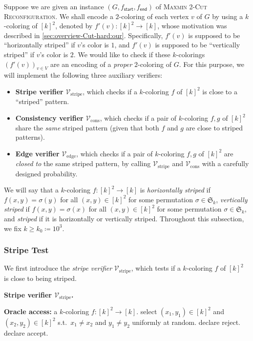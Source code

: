 \documentclass[11pt,fleqn]{article}
\renewcommand{\geq}{\geqslant}
\newcommand{\prb}[1]{\textsc{#1}\xspace}
\newcommand{\defeq}{\coloneq}
\newcommand{\sss}{\mathsf{start}}
\newcommand{\ttt}{\mathsf{end}}
\newcommand{\V}{\calV}
\newcommand{\Accept}{\textsf{accept}\xspace}
\newcommand{\Reject}{\textsf{reject}\xspace}
\newcommand{\f}{f}
\newcommand{\g}{g}
\newcommand{\kzero}{10^3}
\newcommand{\Vstripe}{\V_\mathrm{stripe}}
\newcommand{\Vcons}{\V_\mathrm{cons}}
\newcommand{\Vedge}{\V_\mathrm{edge}}
\newcommand{\MMtwoCutReconf}{\prb{Maxmin 2-Cut Reconfiguration}}
\newcommand{\calV}{\mathcal{V}}
\newcommand{\frakS}{\mathfrak{S}}
\theoremstyle{definition}
\numberwithin{equation}{section}
\begin{document}
Suppose we are given an instance $(G,\f_\sss,\f_\ttt)$ of \MMtwoCutReconf.
We shall encode a $2$-coloring of each vertex $v$ of $G$
by using a $k$-coloring of $[k]^2$, denoted by $\f'(v) \colon [k]^2 \to [k]$,
whose motivation was described in \cref{sec:overview-Cut-hard:our}.
Specifically,
$\f'(v)$ is supposed to be ``horizontally striped'' if $v$'s color is $1$, and
$\f'(v)$ is supposed to be ``vertically striped'' if $v$'s color is $2$.
We would like to check if
these $k$-colorings $(\f'(v))_{v \in V}$ are an encoding of a \emph{proper} $2$-coloring of $G$.
For this purpose,
we will implement the following three auxiliary verifiers:
\begin{itemize}
    \item \textbf{Stripe verifier} $\Vstripe$, which checks
        if a $k$-coloring $\f$ of $[k]^2$ is close to a ``striped'' pattern.
    \item \textbf{Consistency verifier} $\Vcons$, which checks
        if a pair of $k$-coloring $\f, \g$ of $[k]^2$
        share the \emph{same} striped pattern
        (given that both $\f$ and $\g$ are close to striped patterns).
    \item \textbf{Edge verifier} $\Vedge$, which checks
        if a pair of $k$-coloring $\f, \g$ of $[k]^2$
        are \emph{closed to} the same striped pattern,
        by calling $\Vstripe$ and $\Vcons$ with a carefully designed probability.
\end{itemize}


We will say that a $k$-coloring $\f \colon [k]^2 \to [k]$ is
\emph{horizontally striped} if 
$\f(x,y) = \sigma(y)$ for all $(x,y) \in [k]^2$
for some permutation $\sigma \in \frakS_k$,
\emph{vertically striped} if
$\f(x,y) = \sigma(x)$ for all $(x,y) \in [k]^2$
for some permutation $\sigma \in \frakS_k$, and
\emph{striped} if
it is horizontally or vertically striped.
Throughout this subsection, we fix $k \geq k_0 \defeq \kzero$.


\subsubsection{Stripe Test}
\label{sec:Cut-hard:tests:stripe}


We first introduce the \emph{stripe verifier} $\Vstripe$,
which tests if a $k$-coloring $\f$ of $[k]^2$ is close to being striped.


\begin{itembox}[l]{\textbf{Stripe verifier $\Vstripe$.}}
\begin{algorithmic}[1]
    \item[\textbf{Oracle access:}]
        a $k$-coloring $\f \colon [k]^2 \to [k]$.
    \State select $(x_1,y_1) \in [k]^2$ and $(x_2,y_2) \in [k]^2$
        s.t.~$x_1 \neq x_2$ and $y_1 \neq y_2$ uniformly at random.
    \If{$\f(x_1,y_1) = \f(x_2,y_2)$}
        \State declare \Reject.
    \Else
        \State declare \Accept.
    \EndIf
\end{algorithmic}
\end{itembox}
\end{document}
